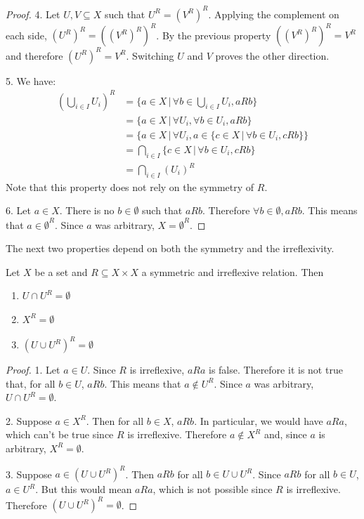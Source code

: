 \begin{mathSection}
\begin{proof}
		4. Let $U, V \subseteq X$ such that $U^{R} = (V^{R})^{R}$. Applying the complement on each side, $(U^{R})^{R} = ((V^{R})^{R})^{R}$. By the previous property $((V^{R})^{R})^{R} = V^{R}$ and therefore $(U^{R})^{R} = V^{R}$. Switching $U$ and $V$ proves the other direction.
		
		5. We have:
		\begin{equation*}
			\begin{aligned}
				(\bigcup_{i \in I} U_i )^{R} &= \{ a \in X \, | \, \forall b \in \bigcup_{i \in I} U_i, aRb \} \\
				&= \{ a \in X \, | \, \forall U_i, \forall  b \in U_i, aRb \} \\
				&= \{ a \in X \, | \, \forall U_i, a \in \{ c \in X \, | \,  \forall  b \in U_i, cRb \} \} \\
				&= \bigcap_{i \in I} \{ c \in X \, | \, \forall  b \in U_i, cRb\} \\
				&= \bigcap_{i \in I} (U_i)^{R}
			\end{aligned}
		\end{equation*}
		Note that this property does not rely on the symmetry of $R$.
		
		6. Let $a \in X$. There is no $b \in \emptyset$ such that $aRb$. Therefore $\forall b \in \emptyset, aRb$. This means that $a \in \emptyset^{R}$. Since $a$ was arbitrary, $X = \emptyset^{R}$.
	\end{proof}
\end{mathSection}

The next two properties depend on both the symmetry and the irreflexivity.

\begin{mathSection}
	\begin{prop}\label{pm-es-symirreflproperties}
		Let $X$ be a set and $R \subseteq X \times X$ a symmetric and irreflexive relation. Then
		\begin{enumerate}
			\item $U \cap U^{R} = \emptyset$
			\item $X^{R} = \emptyset$
			\item $(U \cup U^{R})^{R} = \emptyset$
		\end{enumerate}
	\end{prop}
	
	\begin{proof}
		1. Let $a \in U$. Since $R$ is irreflexive,  $aRa$ is false. Therefore it is not true that, for all $b \in U$, $aRb$. This means that $a \notin U^{R}$. Since $a$ was arbitrary, $U \cap U^{R} = \emptyset$.
		
		2. Suppose $a \in X^{R}$. Then for all $b \in X$, $aRb$. In particular, we would have $aRa$, which can't be true since $R$ is irreflexive. Therefore $a \notin X^{R}$ and, since $a$ is arbitrary, $X^{R} = \emptyset$.
		
		3. Suppose $a \in (U \cup U^{R})^{R}$. Then $aRb$ for all $b \in U\cup U^{R}$. Since $aRb$ for all $b \in U$, $a \in U^{R}$. But this would mean $aRa$, which is not possible since $R$ is irreflexive. Therefore $(U \cup U^{R})^{R} = \emptyset$.
	\end{proof}
\end{mathSection}

